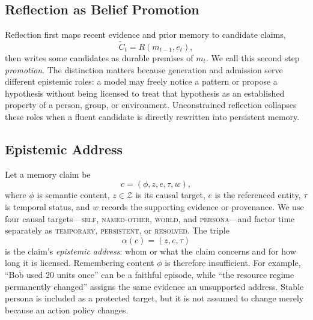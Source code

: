 \documentclass[sigconf,anonymous]{acmart}
\newcommand{\ourscope}{\mathcal{Z}}
\begin{document}
\subsection{Reflection as Belief Promotion}

Reflection first maps recent evidence and prior memory to candidate claims,
\begin{equation}
  \widetilde{C}_t=R(m_{t-1},e_t),
  \label{eq:candidates}
\end{equation}
then writes some candidates as durable premises of $m_t$. We call this second
step \emph{promotion}. The distinction matters because generation and admission
serve different epistemic roles: a model may freely notice a pattern or propose
a hypothesis without being licensed to treat that hypothesis as an established
property of a person, group, or environment. Unconstrained reflection collapses
these roles when a fluent candidate is directly rewritten into persistent
memory.

\subsection{Epistemic Address}

Let a memory claim be
\begin{equation}
  c=(\phi,z,e,\tau,w),
  \label{eq:claim}
\end{equation}
where $\phi$ is semantic content, $z\in\ourscope$ is its causal target,
$e$ is the referenced entity, $\tau$ is temporal status, and $w$ records the
supporting evidence or provenance. We use four causal targets---\textsc{self},
\textsc{named-other}, \textsc{world}, and \textsc{persona}---and factor time
separately as \textsc{temporary}, \textsc{persistent}, or \textsc{resolved}.
The triple
\begin{equation}
  \alpha(c)=(z,e,\tau)
  \label{eq:address}
\end{equation}
is the claim's \emph{epistemic address}: whom or what the claim concerns and
for how long it is licensed. Remembering content $\phi$ is therefore
insufficient. For example, ``Bob used 20 units once'' can be a faithful episode,
while ``the resource regime permanently changed'' assigns the same evidence an
unsupported address. Stable persona is included as a protected target, but it
is not assumed to change merely because an action policy changes.
\end{document}
